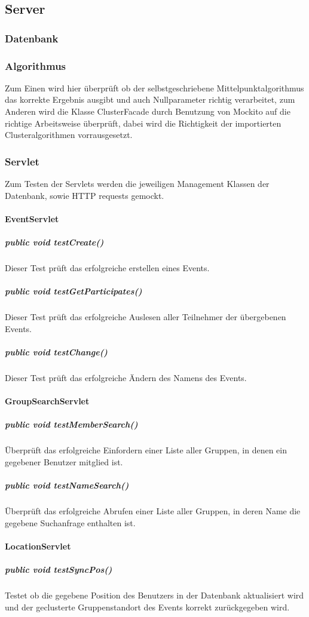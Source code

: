 \documentclass{scrartcl}
\begin{document}
	\subsection{Server}
	\subsubsection{Datenbank}
	\subsubsection{Algorithmus}
	Zum Einen wird hier überprüft ob der selbstgeschriebene Mittelpunktalgorithmus das korrekte Ergebnis ausgibt und auch Nullparameter richtig verarbeitet, zum Anderen wird die Klasse ClusterFacade durch Benutzung von Mockito auf die richtige Arbeitsweise überprüft, dabei wird die Richtigkeit der importierten Clusteralgorithmen vorrausgesetzt. 
	\subsubsection{Servlet}
	Zum Testen der Servlets werden die jeweiligen Management Klassen der Datenbank, sowie HTTP requests gemockt.
	\paragraph{EventServlet}
	\subparagraph{public void testCreate()}
	Dieser Test prüft das erfolgreiche erstellen eines Events. 
	\subparagraph{public void testGetParticipates()}
	Dieser Test prüft das erfolgreiche Auslesen aller Teilnehmer der übergebenen Events.
	\subparagraph{public void testChange()}
	Dieser Test prüft das erfolgreiche Ändern des Namens des Events.
	\paragraph{GroupSearchServlet}
	\subparagraph{public void testMemberSearch()}
	Überprüft das erfolgreiche Einfordern einer Liste aller Gruppen, in denen ein gegebener Benutzer mitglied ist.
	\subparagraph{public void testNameSearch()}
	Überprüft das erfolgreiche Abrufen einer Liste aller Gruppen, in deren Name die gegebene Suchanfrage enthalten ist.
	\paragraph{LocationServlet}
	\subparagraph{public void testSyncPos()}
	Testet ob die gegebene Position des Benutzers in der Datenbank aktualisiert wird und der geclusterte Gruppenstandort des Events korrekt zurückgegeben wird.
\end{document}
